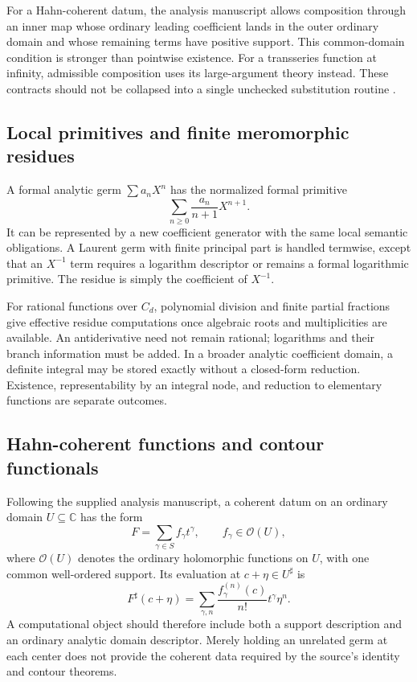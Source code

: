 \documentclass[11pt,letterpaper]{article}
\theoremstyle{definition}
\newcommand{\C}{\mathbb C}
\newcommand{\OO}{\mathcal O}
\newcommand{\sh}{^{\sharp}}
\numberwithin{equation}{section}
\begin{document}
For a Hahn-coherent datum, the analysis manuscript allows composition through an inner map whose ordinary leading coefficient lands in the outer ordinary domain and whose remaining terms have positive support. This common-domain condition is stronger than pointwise existence. For a transseries function at infinity, admissible composition uses its large-argument theory instead. These contracts should not be collapsed into a single unchecked substitution routine \cite{SourceAnalysis,BMFunctions}.

\subsection{Local primitives and finite meromorphic residues}
A formal analytic germ $\sum a_nX^n$ has the normalized formal primitive
\[
 \sum_{n\ge0}\frac{a_n}{n+1}X^{n+1}.
\]
It can be represented by a new coefficient generator with the same local semantic obligations. A Laurent germ with finite principal part is handled termwise, except that an $X^{-1}$ term requires a logarithm descriptor or remains a formal logarithmic primitive. The residue is simply the coefficient of $X^{-1}$.

For rational functions over $C_d$, polynomial division and finite partial fractions give effective residue computations once algebraic roots and multiplicities are available. An antiderivative need not remain rational; logarithms and their branch information must be added. In a broader analytic coefficient domain, a definite integral may be stored exactly without a closed-form reduction. Existence, representability by an integral node, and reduction to elementary functions are separate outcomes.

\subsection{Hahn-coherent functions and contour functionals}
Following the supplied analysis manuscript, a coherent datum on an ordinary domain $U\subseteq\C$ has the form
\begin{equation}\label{eq:coherent}
 F=\sum_{\gamma\in S}f_\gamma t^\gamma,
 \qquad f_\gamma\in\OO(U),
\end{equation}
where $\OO(U)$ denotes the ordinary holomorphic functions on $U$, with one common well-ordered support. Its evaluation at $c+\eta\in U\sh$ is
\[
 F\sh(c+\eta)=\sum_{\gamma,n}
       \frac{f_\gamma^{(n)}(c)}{n!}t^\gamma\eta^n.
\]
A computational object should therefore include both a support description and an ordinary analytic domain descriptor. Merely holding an unrelated germ at each center does not provide the coherent data required by the source's identity and contour theorems.
\end{document}
